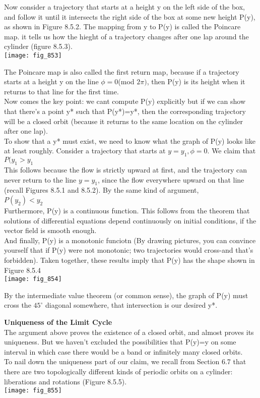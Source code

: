 \documentclass{article}
\newcommand\tab[1][1cm]{\hspace*{#1}}
\begin{document}
Now consider a trajectory that starts at a height y on the left side of the box, and follow it until it intersects the right side of the box at some new height P(y), as shown in Figure 8.5.2. The mapping from y to P(y) is called the Poincare map. it tells us how the hieght of a trajectory changes after one lap around the cylinder (figure 8.5.3). \\

\texttt{[image: fig\_853]}

The Poincare map is also called the first return map, because if a trajectory starts at a height y on the line $\phi=0$(mod $2\pi)$, then P(y) is its height when it returns to that line for the first time. \\ \tab
Now comes the key point: we cant compute P(y) explicitly but if we can show that there's a point y* such that P(y*)=y*, then the corresponding trajectory will be a closed orbit (because it returns to the same location on the cylinder after one lap). \\ \tab
To show that a y* must exist, we need to know what the graph of P(y) looks like at least roughly. Consider a trajectory that starts at $y=y_{1}, \phi=0$. We claim that \\ \tab \tab
$P(y_{1}>y_{1}$ \\
This follows because the flow is strictly upward at first, and the trajectory can never return to the line $y=y_{1}$, since the flow everywhere upward on that line (recall Figures 8.5.1 and 8.5.2). By the same kind of argument, \\ \tab \tab
$P(y_{2})<y_{2}$ \\
Furthermore, P(y) is a continuous function. This follows from the theorem that solutions of differential equations depend continuously on initial conditions, if the vector field is smooth enough. \\
\tab And finally, P(y) is a monotonic funciotn (By drawing pictures, you can convince yourself that if P(y) were not monotonic; two trajectories would cross-and that's forbidden). Taken together, these results imply that P(y) has the shape shown in Figure 8.5.4 \\ 
\texttt{[image: fig\_854]}

By the intermediate value theorem (or common sense), the graph of P(y) must cross the $45^{\circ}$ diagonal somewhere, that intersection is our desired y*.

\textbf {Uniqueness of the Limit Cycle} \\
\tab The argument above proves the existence of a closed orbit, and almost proves its uniqueness. But we haven't excluded the possibilities that P(y)=y on some interval in which case there would be a band or infinitely many closed orbits. \\ \tab
To nail down the uniqueness part of our claim, we recall from Section 6.7 that there are two topologically different kinds of periodic orbits on a cylinder: liberations and rotations (Figure 8.5.5). \\ 
\texttt{[image: fig\_855]} 
\end{document}
